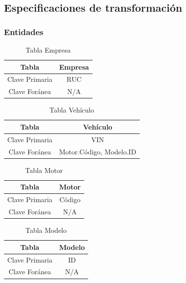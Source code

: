 \documentclass[12pt]{article}
\begin{document}
\newpage

\subsection{Especificaciones de transformaci\'on}

\subsubsection{Entidades}


\begin{table}[htbp]
\begin{center}
\begin{tabular}{|c|c|}
\hline
Tabla & Empresa \\
\hline
Clave Primaria & RUC \\
\hline
Clave Foránea & N/A \\
\hline
\end{tabular}
\caption{Tabla Empresa}
\end{center}
\end{table}


\begin{table}[htbp]
\begin{center}
\begin{tabular}{|c|c|}
\hline
Tabla & Vehículo \\
\hline
Clave Primaria & VIN \\
\hline
Clave Foránea & Motor.Código, Modelo.ID \\
\hline
\end{tabular}
\caption{Tabla Vehículo}
\end{center}
\end{table}


\begin{table}[htbp]
\begin{center}
\begin{tabular}{|c|c|}
\hline
Tabla & Motor \\
\hline
Clave Primaria & Código \\
\hline
Clave Foránea & N/A \\
\hline
\end{tabular}
\caption{Tabla Motor}
\end{center}
\end{table}


\begin{table}[htbp]
\begin{center}
\begin{tabular}{|c|c|}
\hline
Tabla & Modelo \\
\hline
Clave Primaria & ID \\
\hline
Clave Foránea & N/A \\
\hline
\end{tabular}
\caption{Tabla Modelo}
\end{center}
\end{table}
\end{document}
